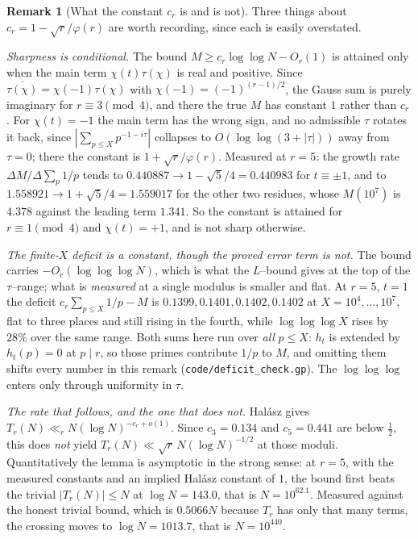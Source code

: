 \documentclass[11pt]{article}
\theoremstyle{definition}
\newtheorem{remark}[theorem]{Remark}
\begin{document}
\begin{remark}[What the constant $c_r$ is and is not]\label{rem:charcancelsharp}
Three things about $c_r=1-\sqrt r/\varphi(r)$ are worth recording, since each is easily overstated.

\emph{Sharpness is conditional.} The bound $M\ge c_r\log\log N-O_r(1)$ is attained only when the
main term $\chi(t)\tau(\chi)$ is real and positive. Since $\overline{\tau(\chi)}=\chi(-1)\tau(\chi)$
with $\chi(-1)=(-1)^{(r-1)/2}$, the Gauss sum is purely imaginary for $r\equiv3\pmod4$, and there
the true $M$ has constant $1$ rather than $c_r$. For $\chi(t)=-1$ the main term has the wrong sign, and no
admissible $\tau$ rotates it back, since $|\sum_{p\le X}p^{-1-i\tau}|$ collapses to
$O(\log\log(3+|\tau|))$ away from $\tau=0$; there the constant is $1+\sqrt r/\varphi(r)$. Measured
at $r=5$: the growth rate $\Delta M/\Delta\sum_p1/p$ tends to $0.440887\to1-\sqrt5/4=0.440983$ for
$t\equiv\pm1$, and to $1.558921\to1+\sqrt5/4=1.559017$ for the other two residues, whose $M(10^7)$
is $4.378$ against the leading term $1.341$. So the constant is attained for
$r\equiv1\pmod4$ and $\chi(t)=+1$, and is not sharp otherwise.

\emph{The finite-$X$ deficit is a constant, though the proved error term is not.} The bound carries
$-O_r(\log\log\log N)$, which is what the $L$--bound gives at the top of the $\tau$--range; what is
\emph{measured} at a single modulus is smaller and flat. At $r=5$, $t=1$ the deficit
$c_r\sum_{p\le X}1/p-M$ is $0.1399,0.1401,0.1402,0.1402$ at $X=10^4,\dots,10^7$, flat to three
places and still rising in the fourth, while $\log\log\log X$ rises by $28\%$ over the same range.
Both sums here run over \emph{all} $p\le X$: $h_t$ is extended by $h_t(p)=0$ at $p\mid r$, so those
primes contribute $1/p$ to $M$, and omitting them shifts every number in this remark
\textup{(\texttt{code/deficit\_check.gp})}. The $\log\log\log$ enters only
through uniformity in $\tau$.

\emph{The rate that follows, and the one that does not.} Hal\'asz gives
$T_r(N)\ll_rN(\log N)^{-c_r+o(1)}$. Since $c_3=0.134$ and $c_5=0.441$ are below $\tfrac12$, this does \emph{not} yield $T_r(N)\ll\sqrt r\,N(\log N)^{-1/2}$ at those moduli. Quantitatively the lemma is asymptotic in the strong sense: at $r=5$, with the
measured constants and an implied Hal\'asz constant of $1$, the bound first beats the trivial
$|T_r(N)|\le N$ at $\log N=143.0$, that is $N=10^{62.1}$. Measured against the honest trivial bound,
which is $0.5066N$ because $T_r$ has only that many terms, the crossing moves to $\log N=1013.7$,
that is $N=10^{440}$.
\end{remark}
\end{document}
